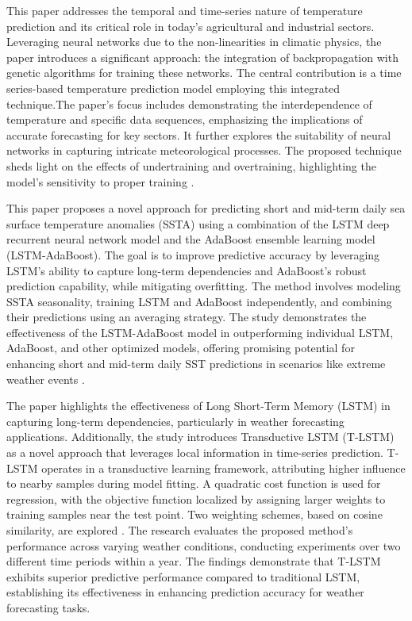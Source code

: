 \documentclass[sn-mathphys,Numbered]{sn-jnl}
\theoremstyle{thmstyleone}
\theoremstyle{thmstyletwo}
\theoremstyle{thmstylethree}
\begin{document}
This paper addresses the temporal and time-series nature of temperature prediction and its critical role in today's agricultural and industrial sectors. Leveraging neural networks due to the non-linearities in climatic physics, the paper introduces a significant approach: the integration of backpropagation with genetic algorithms for training these networks. The central contribution is a time series-based temperature prediction model employing this integrated technique.The paper's focus includes demonstrating the interdependence of temperature and specific data sequences, emphasizing the implications of accurate forecasting for key sectors. It further explores the suitability of neural networks in capturing intricate meteorological processes. The proposed technique sheds light on the effects of undertraining and overtraining, highlighting the model's sensitivity to proper training \cite{singh2011time}.

 This paper proposes a novel approach for predicting short and mid-term daily sea surface temperature anomalies (SSTA) using a combination of the LSTM deep recurrent neural network model and the AdaBoost ensemble learning model (LSTM-AdaBoost). The goal is to improve predictive accuracy by leveraging LSTM's ability to capture long-term dependencies and AdaBoost's robust prediction capability, while mitigating overfitting. The method involves modeling SSTA seasonality, training LSTM and AdaBoost independently, and combining their predictions using an averaging strategy. The study demonstrates the effectiveness of the LSTM-AdaBoost model in outperforming individual LSTM, AdaBoost, and other optimized models, offering promising potential for enhancing short and mid-term daily SST predictions in scenarios like extreme weather events \cite{XIAO2019111358}.

 The paper highlights the effectiveness of Long Short-Term Memory (LSTM) in capturing long-term dependencies, particularly in weather forecasting applications. Additionally, the study introduces Transductive LSTM (T-LSTM) as a novel approach that leverages local information in time-series prediction. T-LSTM operates in a transductive learning framework, attributing higher influence to nearby samples during model fitting. A quadratic cost function is used for regression, with the objective function localized by assigning larger weights to training samples near the test point. Two weighting schemes, based on cosine similarity, are explored \cite{XIAO2019111358}.
The research evaluates the proposed method's performance across varying weather conditions, conducting experiments over two different time periods within a year. The findings demonstrate that T-LSTM exhibits superior predictive performance compared to traditional LSTM, establishing its effectiveness in enhancing prediction accuracy for weather forecasting tasks.
\end{document}

